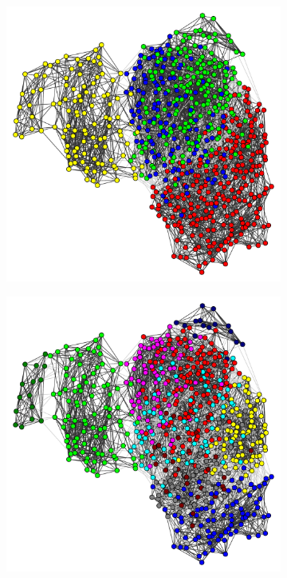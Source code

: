 \begin{figure}[htbp]
  \begin{subfigure}[t]{0.33\textwidth}
  \centering
    \includegraphics[width=\linewidth]{graphclust_cpm_00p010_is20016.pdf}
    \caption{
    }
    \label{fig:graphclustering-cpm_00p010}
  \end{subfigure}%
  \begin{subfigure}[t]{0.33\textwidth}
  \centering
    \includegraphics[width=\linewidth]{graphclust_cpm_00p020_is20016.pdf}

\end{subfigure}
\end{figure}

